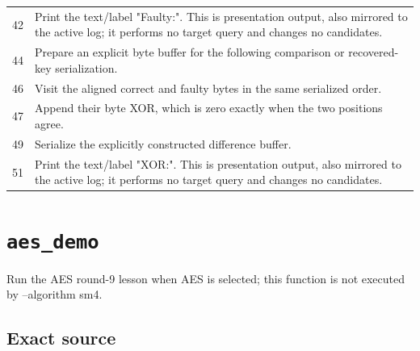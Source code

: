 \begin{longtable}{r >{\raggedright\arraybackslash}p{138mm}}
42&Print the text/label "Faulty:". This is presentation output, also mirrored to the active log; it performs no target query and changes no candidates.\\
44&Prepare an explicit byte buffer for the following comparison or recovered-key serialization.\\
46&Visit the aligned correct and faulty bytes in the same serialized order.\\
47&Append their byte XOR, which is zero exactly when the two positions agree.\\
49&Serialize the explicitly constructed difference buffer.\\
51&Print the text/label "XOR:". This is presentation output, also mirrored to the active log; it performs no target query and changes no candidates.\\
\bottomrule\end{longtable}\endgroup
\section{\texttt{aes\_demo}}
Run the AES round-9 lesson when AES is selected; this function is not executed by --algorithm sm4.
\begin{center}\end{center}
\subsection*{Exact source}
